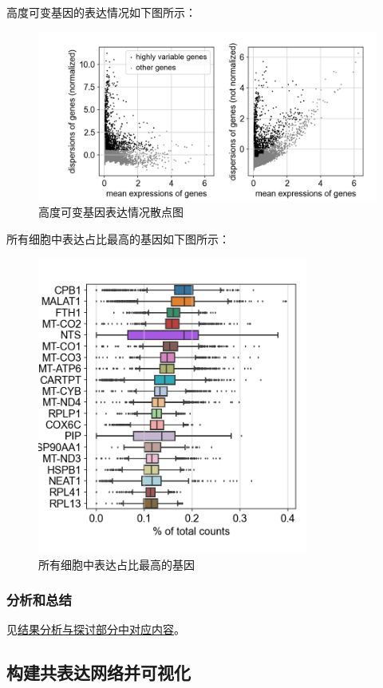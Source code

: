 \documentclass {article}
\begin{document}
			高度可变基因的表达情况如下图所示：
			\begin{figure}[H]
				\centering
				\includegraphics[width=4.5in]{figures/fig3.png}
				\caption{高度可变基因表达情况散点图}
			\end{figure}
			
			所有细胞中表达占比最高的基因如下图所示：
			\begin{figure}[H]
				\centering
				\includegraphics[width=3.5in]{figures/fig4.png}
				\caption{所有细胞中表达占比最高的基因}
			\end{figure}
			
		\subsubsection{分析和总结}
			见\hyperref[分析和总结]{结果分析与探讨部分中对应内容}。
		
	\subsection{构建共表达网络并可视化}
\end{document}
